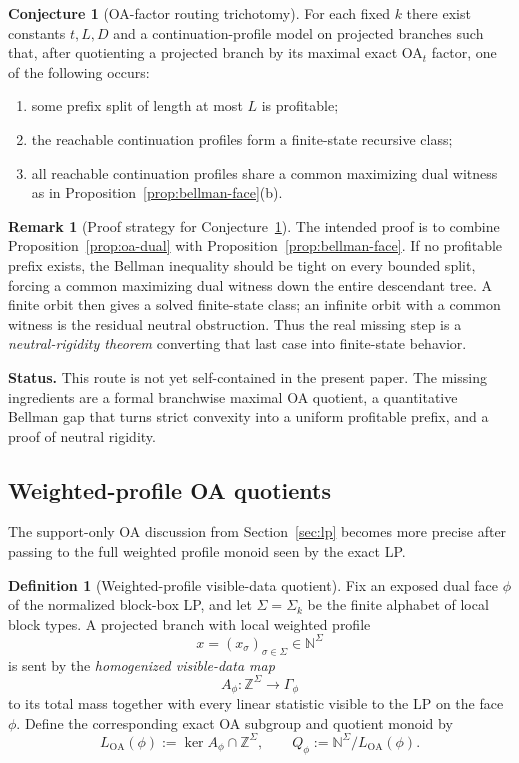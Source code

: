 \documentclass[11pt]{article}
\theoremstyle{definition}
\newtheorem{definition}[theorem]{Definition}
\newtheorem{conjecture}[theorem]{Conjecture}
\newtheorem{remark}[theorem]{Remark}
\newcommand{\N}{\mathbb{N}}
\newcommand{\Z}{\mathbb{Z}}
\newcommand{\1}{\mathbf{1}}
\newcommand{\status}[1]{\par\smallskip\noindent\textbf{Status.} #1\par\smallskip}
\begin{document}
\begin{conjecture}[OA-factor routing trichotomy]\label{conj:oa-quotient}
For each fixed $k$ there exist constants $t,L,D$ and a continuation-profile model on projected branches such that, after quotienting a projected branch by its maximal exact OA$_t$ factor, one of the following occurs:
\begin{enumerate}[label=(\roman*),leftmargin=2.2em]
\item some prefix split of length at most $L$ is profitable;
\item the reachable continuation profiles form a finite-state recursive class;
\item all reachable continuation profiles share a common maximizing dual witness as in Proposition~\ref{prop:bellman-face}(b).
\end{enumerate}
\end{conjecture}

\begin{remark}[Proof strategy for Conjecture~\ref{conj:oa-quotient}]
The intended proof is to combine Proposition~\ref{prop:oa-dual} with Proposition~\ref{prop:bellman-face}. If no profitable prefix exists, the Bellman inequality should be tight on every bounded split, forcing a common maximizing dual witness down the entire descendant tree. A finite orbit then gives a solved finite-state class; an infinite orbit with a common witness is the residual neutral obstruction. Thus the real missing step is a \emph{neutral-rigidity theorem} converting that last case into finite-state behavior.
\end{remark}

\status{This route is not yet self-contained in the present paper. The missing ingredients are a formal branchwise maximal OA quotient, a quantitative Bellman gap that turns strict convexity into a uniform profitable prefix, and a proof of neutral rigidity.}

\subsection*{Weighted-profile OA quotients}
The support-only OA discussion from Section~\ref{sec:lp} becomes more precise after passing to the full weighted profile monoid seen by the exact LP.

\begin{definition}[Weighted-profile visible-data quotient]\label{def:weighted-oa-quotient}
Fix an exposed dual face $\phi$ of the normalized block-box LP, and let $\Sigma=\Sigma_k$ be the finite alphabet of local block types. A projected branch with local weighted profile
\[
x=(x_\sigma)_{\sigma\in\Sigma}\in \N^\Sigma
\]
is sent by the \emph{homogenized visible-data map}
\[
A_\phi:\Z^\Sigma\to \Gamma_\phi
\]
to its total mass together with every linear statistic visible to the LP on the face $\phi$. Define the corresponding exact OA subgroup and quotient monoid by
\[
L_{\mathrm{OA}}(\phi):=\ker A_\phi\cap \Z^\Sigma,
\qquad
Q_\phi:=\N^\Sigma/L_{\mathrm{OA}}(\phi).
\]
\end{definition}
\end{document}

